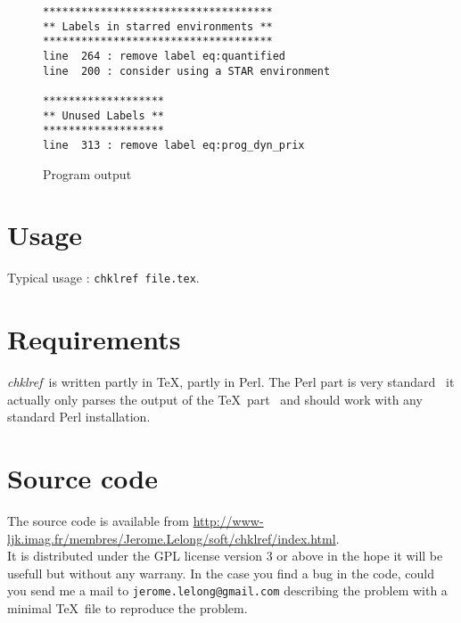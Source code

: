 \documentclass[a4paper,11pt,twoside]{article}
\def\chk{{\it chklref}}
\def\endpage{}%
\def\endpage{\HCode{</div>}}%
\begin{document}
\begin{figure}[htbp]
  \centering
\begin{verbatim}
************************************
** Labels in starred environments **
************************************
line  264 : remove label eq:quantified
line  200 : consider using a STAR environment

*******************
** Unused Labels **
*******************
line  313 : remove label eq:prog_dyn_prix
\end{verbatim}
  \caption{Program output}
  \label{fig:output}
\end{figure}


\section{Usage}

Typical usage : \verb!chklref file.tex!.
\\


\section{Requirements}

\chk\ is written partly in \TeX, partly in Perl. The Perl part is very
standard \textemdash\ it actually only parses the output of the \TeX\ part
\textemdash\ and should work with any standard Perl installation.


\section{Source code}

The source code is available from
\url{http://www-ljk.imag.fr/membres/Jerome.Lelong/soft/chklref/index.html}.
\\

\noindent It is distributed under the GPL license version 3 or above in the
hope it will be usefull but without any warrany. In the case you find a bug in
the code, could you send me a mail to \verb!jerome.lelong@gmail.com! describing
the problem with a minimal \TeX\ file to reproduce the problem.

\endpage
\end{document}
